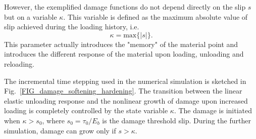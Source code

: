\documentclass[main.tex]{subfiles}
\begin{document}
However, the exemplified damage functions do not depend directly on the slip $s$ but on a variable
$\kappa$. This variable is defined as the maximum absolute value of  slip achieved during 
the loading history, i.e.
\begin{equation}
\kappa = \mathrm{max} \{|s|\}.
\end{equation}
This parameter actually introduces the "memory" of the material point and 
introduces the different response of the material upon loading, unloading and reloading.  

The incremental time stepping used in the  numerical simulation 
is sketched in Fig.~\ref{FIG_damage_softening_hardening}. The transition between 
the linear elastic unloading response and the nonlinear growth of damage upon
increased loading is completely controlled by the state variable $\kappa$.
The damage is initiated when $\kappa > s_0$, 
where $s_0 = \tau_0 / E_b$ is the damage threshold slip. During the further simulation, 
damage can grow only if $s > \kappa$.
\end{document}
